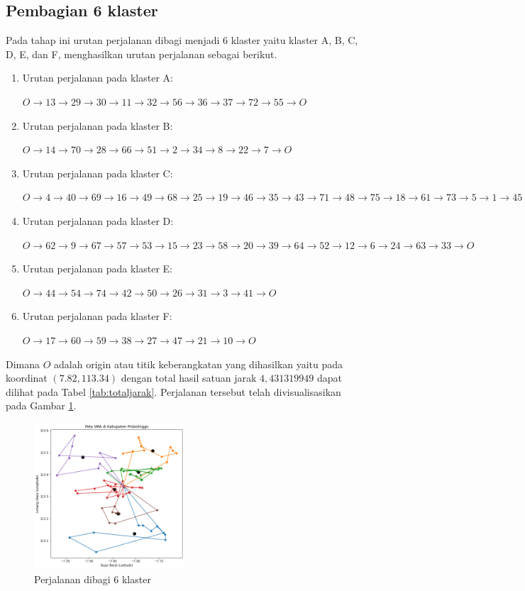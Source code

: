\subsection{Pembagian 6 klaster}

Pada tahap ini urutan perjalanan dibagi menjadi 6 klaster yaitu klaster A, B, C, D, E, dan F, menghasilkan urutan perjalanan sebagai berikut.

\begin{enumerate}

\item Urutan perjalanan pada klaster A:

$O \to 13 \to 29 \to 30 \to 11 \to 32 \to 56 \to 36 \to 37 \to 72 \to 55 \to O$

\item Urutan perjalanan pada klaster B:

$O \to 14 \to 70 \to 28 \to 66 \to 51 \to 2 \to 34 \to 8 \to 22 \to 7 \to O$

\item Urutan perjalanan pada klaster C:

$O \to 4 \to 40 \to 69 \to 16 \to 49 \to 68 \to 25 \to 19 \to 46 \to 35 \to 43 \to 71 \to 48 \to 75 \to 18 \to 61 \to 73 \to 5 \to 1 \to 45 \to 65 \to O$

\item Urutan perjalanan pada klaster D:

$O \to 62 \to 9 \to 67 \to 57 \to 53 \to 15 \to 23 \to 58 \to 20 \to 39 \to 64 \to 52 \to 12 \to 6 \to 24 \to 63 \to 33 \to O$

\item Urutan perjalanan pada klaster E:

$O \to 44 \to 54 \to 74 \to 42 \to 50 \to 26 \to 31 \to 3 \to 41 \to O$

\item Urutan perjalanan pada klaster F:

$O \to 17 \to 60 \to 59 \to 38 \to 27 \to 47 \to 21 \to 10 \to O$

\end{enumerate}

Dimana $O$ adalah origin atau titik keberangkatan yang dihasilkan yaitu pada koordinat $(7.82, 113.34)$ dengan total hasil satuan jarak $4,431319949$ dapat dilihat pada Tabel \ref{tab:totaljarak}. Perjalanan tersebut telah divisualisasikan pada Gambar \ref{fig:hasil_mtsp6}.

\begin{figure}[H]
\centering
\includegraphics[width=0.5\textwidth]{Gambar/hasil_mtsp/6}
\caption{Perjalanan dibagi 6 klaster}
\label{fig:hasil_mtsp6}
\end{figure}


